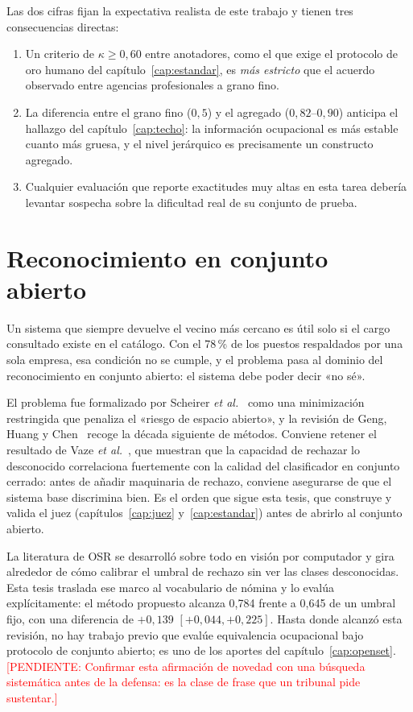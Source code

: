 \documentclass[12pt,a4paper,oneside]{report}
\newcommand{\pend}[1]{\textcolor{red}{\small[PENDIENTE: #1]}}
\begin{document}
Las dos cifras fijan la expectativa realista de este trabajo y tienen tres consecuencias
directas:

\begin{enumerate}
  \item Un criterio de $\kappa \geq 0{,}60$ entre anotadores, como el que exige el
  protocolo de oro humano del capítulo~\ref{cap:estandar}, es \emph{más estricto} que el
  acuerdo observado entre agencias profesionales a grano fino.
  \item La diferencia entre el grano fino ($0{,}5$) y el agregado ($0{,}82$--$0{,}90$)
  anticipa el hallazgo del capítulo~\ref{cap:techo}: la información ocupacional es más
  estable cuanto más gruesa, y el nivel jerárquico es precisamente un constructo agregado.
  \item Cualquier evaluación que reporte exactitudes muy altas en esta tarea debería
  levantar sospecha sobre la dificultad real de su conjunto de prueba.
\end{enumerate}

\section{Reconocimiento en conjunto abierto}
\label{sec:openset}

Un sistema que siempre devuelve el vecino más cercano es útil solo si el cargo consultado
existe en el catálogo. Con el 78\,\% de los puestos respaldados por una sola empresa, esa
condición no se cumple, y el problema pasa al dominio del reconocimiento en conjunto
abierto: el sistema debe poder decir «no sé».

El problema fue formalizado por Scheirer \emph{et al.}~\cite{scheirer2013} como una
minimización restringida que penaliza el «riesgo de espacio abierto», y la revisión de
Geng, Huang y Chen~\cite{geng2021openset} recoge la década siguiente de métodos. Conviene
retener el resultado de Vaze \emph{et al.}~\cite{vaze2022}, que muestran que la capacidad
de rechazar lo desconocido correlaciona fuertemente con la calidad del clasificador en
conjunto cerrado: antes de añadir maquinaria de rechazo, conviene asegurarse de que el
sistema base discrimina bien. Es el orden que sigue esta tesis, que construye y valida el
juez (capítulos~\ref{cap:juez} y~\ref{cap:estandar}) antes de abrirlo al conjunto abierto.

La literatura de OSR se desarrolló sobre todo en visión por computador y gira alrededor de
cómo calibrar el umbral de rechazo sin ver las clases desconocidas. Esta tesis traslada
ese marco al vocabulario de nómina y lo evalúa explícitamente: el método propuesto alcanza
0,784 frente a 0,645 de un umbral fijo, con una diferencia de $+0{,}139$
$[+0{,}044, +0{,}225]$.
Hasta donde alcanzó esta revisión, no hay trabajo previo que evalúe equivalencia
ocupacional bajo protocolo de conjunto abierto; es uno de los aportes del
capítulo~\ref{cap:openset}. \pend{Confirmar esta afirmación de novedad con una búsqueda
sistemática antes de la defensa: es la clase de frase que un tribunal pide sustentar.}
\end{document}
